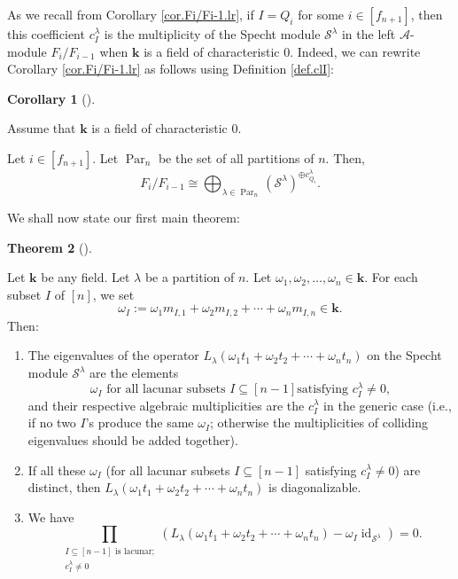 \documentclass[numbers=enddot,12pt,final,onecolumn,notitlepage]{scrartcl}%
\theoremstyle{definition}
\newtheorem{theo}{Theorem}[section]
\newenvironment{theorem}[1][]
{\begin{theo}[#1]\begin{leftbar}}
{\end{leftbar}\end{theo}}
\newtheorem{coro}[theo]{Corollary}
\newenvironment{corollary}[1][]
{\begin{coro}[#1]\begin{leftbar}}
{\end{leftbar}\end{coro}}
\let\prodnonlimits\prod
\renewcommand{\prod}{\prodnonlimits\limits}
\begin{document}
As we recall from Corollary \ref{cor.Fi/Fi-1.lr}, if $I=Q_{i}$ for some
$i\in\left[  f_{n+1}\right]  $, then this coefficient $c_{I}^{\lambda}$ is the
multiplicity of the Specht module $\mathcal{S}^{\lambda}$ in the left
$\mathcal{A}$-module $F_{i}/F_{i-1}$ when $\mathbf{k}$ is a field of
characteristic $0$. Indeed, we can rewrite Corollary \ref{cor.Fi/Fi-1.lr} as
follows using Definition \ref{def.clI}:

\begin{corollary}
\label{cor.Fi/Fi-1.lr-rewr}Assume that $\mathbf{k}$ is a field of
characteristic $0$.

Let $i\in\left[  f_{n+1}\right]  $. Let $\operatorname*{Par}\nolimits_{n}$ be
the set of all partitions of $n$. Then,%
\[
F_{i}/F_{i-1}\cong\bigoplus_{\lambda\in\operatorname*{Par}\nolimits_{n}%
}\left(  \mathcal{S}^{\lambda}\right)  ^{\oplus c_{Q_{i}}^{\lambda}}.
\]

\end{corollary}

We shall now state our first main theorem:

\begin{theorem}
\label{thm.eigs}Let $\mathbf{k}$ be any field. Let $\lambda$ be a partition of
$n$. Let $\omega_{1},\omega_{2},\ldots,\omega_{n}\in\mathbf{k}$. For each
subset $I$ of $\left[  n\right]  $, we set%
\[
\omega_{I}:=\omega_{1}m_{I,1}+\omega_{2}m_{I,2}+\cdots+\omega_{n}m_{I,n}%
\in\mathbf{k}.
\]
Then:

\begin{enumerate}
\item[\textbf{(a)}] The eigenvalues of the operator $L_{\lambda}\left(
\omega_{1}t_{1}+\omega_{2}t_{2}+\cdots+\omega_{n}t_{n}\right)  $ on the Specht
module $\mathcal{S}^{\lambda}$ are the elements%
\begin{equation}
\omega_{I}\text{ for all lacunar subsets }I\subseteq\left[  n-1\right]  \text{
satisfying }c_{I}^{\lambda}\neq0,\nonumber
\end{equation}
and their respective algebraic multiplicities are the $c_{I}^{\lambda}$ in the
generic case (i.e., if no two $I$'s produce the same $\omega_{I}$; otherwise
the multiplicities of colliding eigenvalues should be added together).

\item[\textbf{(b)}] If all these $\omega_{I}$ (for all lacunar subsets
$I\subseteq\left[  n-1\right]  $ satisfying $c_{I}^{\lambda}\neq0$) are
distinct, then $L_{\lambda}\left(  \omega_{1}t_{1}+\omega_{2}t_{2}%
+\cdots+\omega_{n}t_{n}\right)  $ is diagonalizable.

\item[\textbf{(c)}] We have%
\[
\prod_{\substack{I\subseteq\left[  n-1\right]  \text{ is lacunar;}%
\\c_{I}^{\lambda}\neq0}}\left(  L_{\lambda}\left(  \omega_{1}t_{1}+\omega
_{2}t_{2}+\cdots+\omega_{n}t_{n}\right)  -\omega_{I}\operatorname*{id}%
\nolimits_{\mathcal{S}^{\lambda}}\right)  =0.
\]

\end{enumerate}
\end{theorem}
\end{document}
